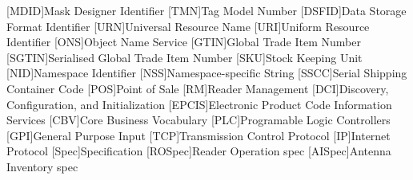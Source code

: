 \begin{multicols}{2}
\begin{acronym}[AAAAAA]
	[MDID]{Mask Designer Identifier}
	[TMN]{Tag Model Number}
	[DSFID]{Data Storage Format Identifier}
	[URN]{Universal Resource Name}
	[URI]{Uniform Resource Identifier}
	[ONS]{Object Name Service}
	[GTIN]{Global Trade Item Number}
	[SGTIN]{Serialised Global Trade Item Number}
	[SKU]{Stock Keeping Unit}
	[NID]{Namespace Identifier}
	[NSS]{Namespace-specific String}
	[SSCC]{Serial Shipping Container Code}
	[POS]{Point of Sale}
	[RM]{Reader Management}
	[DCI]{Discovery, Configuration, and 
	Initialization}
	[EPCIS]{Electronic Product Code Information Services}
	[CBV]{Core Business Vocabulary}
	[PLC]{Programable Logic Controllers}
	[GPI]{General Purpose Input}
	[TCP]{Transmission Control Protocol}
	[IP]{Internet Protocol}
	[Spec]{Specification}
	[ROSpec]{Reader Operation \acs{spec}}
	[AISpec]{Antenna Inventory \acs{spec}}
\end{acronym}
\end{multicols}

